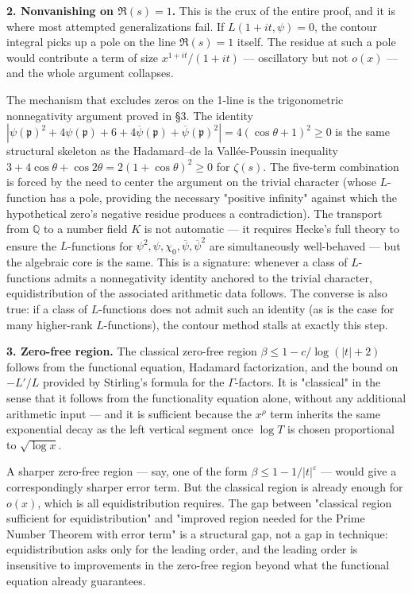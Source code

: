 \documentclass[12pt,a4paper]{article}
\newcommand{\pilcrow}{\S}
\begin{document}
\textbf{2. Nonvanishing on $\Re(s) = 1$.} This is the crux of the entire proof, and it is where most attempted generalizations fail. If $L(1+it, \psi) = 0$, the contour integral picks up a pole on the line $\Re(s) = 1$ itself. The residue at such a pole would contribute a term of size $x^{1+it}/(1+it)$ --- oscillatory but not $o(x)$ --- and the whole argument collapses.

The mechanism that excludes zeros on the 1-line is the trigonometric nonnegativity argument proved in \pilcrow{}3. The identity $|\psi(\mathfrak{p})^{2} + 4\psi(\mathfrak{p}) + 6 + 4\overline{\psi}(\mathfrak{p}) + \overline{\psi}(\mathfrak{p})^{2}| = 4(\cos\theta + 1)^2 \geq 0$ is the same structural skeleton as the Hadamard--de la Vallée-Poussin inequality $3 + 4\cos\theta + \cos 2\theta = 2(1+\cos\theta)^2 \geq 0$ for $\zeta(s)$. The five-term combination is forced by the need to center the argument on the trivial character (whose $L$-function has a pole, providing the necessary "positive infinity" against which the hypothetical zero's negative residue produces a contradiction). The transport from $\mathbb{Q}$ to a number field $K$ is not automatic --- it requires Hecke's full theory to ensure the $L$-functions for $\psi^2, \psi, \chi_0, \overline{\psi}, \overline{\psi}^2$ are simultaneously well-behaved --- but the algebraic core is the same. This is a signature: whenever a class of $L$-functions admits a nonnegativity identity anchored to the trivial character, equidistribution of the associated arithmetic data follows. The converse is also true: if a class of $L$-functions does not admit such an identity (as is the case for many higher-rank $L$-functions), the contour method stalls at exactly this step.

\textbf{3. Zero-free region.} The classical zero-free region $\beta \leq 1 - c/\log(|t|+2)$ follows from the functional equation, Hadamard factorization, and the bound on $-L'/L$ provided by Stirling's formula for the $\Gamma$-factors. It is "classical" in the sense that it follows from the functionality equation alone, without any additional arithmetic input --- and it is sufficient because the $x^\rho$ term inherits the same exponential decay as the left vertical segment once $\log T$ is chosen proportional to $\sqrt{\log x}$.

A sharper zero-free region --- say, one of the form $\beta \leq 1 - 1/|t|^\varepsilon$ --- would give a correspondingly sharper error term. But the classical region is already enough for $o(x)$, which is all equidistribution requires. The gap between "classical region sufficient for equidistribution" and "improved region needed for the Prime Number Theorem with error term" is a structural gap, not a gap in technique: equidistribution asks only for the leading order, and the leading order is insensitive to improvements in the zero-free region beyond what the functional equation already guarantees.
\end{document}

